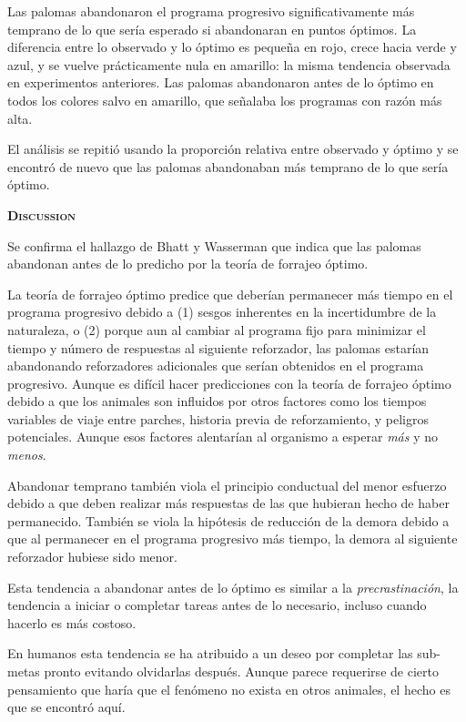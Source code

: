 \documentclass[a4paper,12pt]{article}
\begin{document}
Las palomas abandonaron el programa progresivo significativamente más temprano de lo que sería esperado si abandonaran en puntos óptimos. La diferencia entre lo observado y lo óptimo es pequeña en rojo, crece hacia verde y azul, y se vuelve prácticamente nula en amarillo: la misma tendencia observada en experimentos anteriores. Las palomas abandonaron antes de lo óptimo en todos los colores salvo en amarillo, que señalaba los programas con razón más alta.

El análisis se repitió usando la proporción relativa entre observado y óptimo y se encontró de nuevo que las palomas abandonaban más temprano de lo que sería óptimo.

{\scshape\bfseries Discussion}

Se confirma el hallazgo de Bhatt y Wasserman que indica que las palomas abandonan antes de lo predicho por la teoría de forrajeo óptimo.

La teoría de forrajeo óptimo predice que deberían permanecer más tiempo en el programa progresivo debido a (1) sesgos inherentes en la incertidumbre de la naturaleza, o (2) porque aun al cambiar al programa fijo para minimizar el tiempo y número de respuestas al siguiente reforzador, las palomas estarían abandonando reforzadores adicionales que serían obtenidos en el programa progresivo. Aunque es difícil hacer predicciones con la teoría de forrajeo óptimo debido a que los animales son influidos por otros factores como los tiempos variables de viaje entre parches, historia previa de reforzamiento, y peligros potenciales. Aunque esos factores alentarían al organismo a esperar {\itshape más} y no {\itshape menos}.

Abandonar temprano también viola el principio conductual del menor esfuerzo debido a que deben realizar más respuestas de las que hubieran hecho de haber permanecido. También se viola la hipótesis de reducción de la demora debido a que al permanecer en el programa progresivo más tiempo, la demora al siguiente reforzador hubiese sido menor.

Esta tendencia a abandonar antes de lo óptimo es similar a la {\itshape precrastinación}, la tendencia a iniciar o completar tareas antes de lo necesario, incluso cuando hacerlo es más costoso.

En humanos esta tendencia se ha atribuido a un deseo por completar las sub-metas pronto evitando olvidarlas después. Aunque parece requerirse de cierto pensamiento que haría que el fenómeno no exista en otros animales, el hecho es que se encontró aquí.
\end{document}
